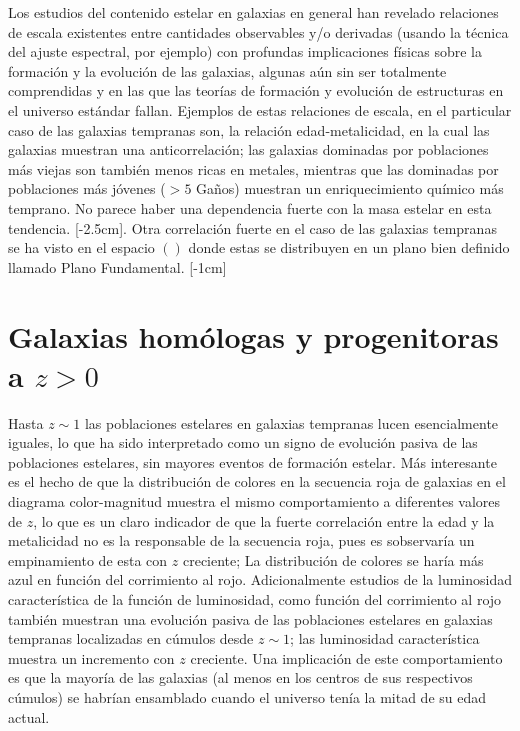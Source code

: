 \documentclass[a4paper,twoside]{article}
\begin{document}
Los estudios del contenido estelar en galaxias en general han revelado relaciones de escala existentes entre cantidades observables y/o derivadas (usando la técnica del ajuste espectral, por ejemplo) con profundas implicaciones físicas sobre la formación y la evolución de las galaxias, algunas aún sin ser totalmente comprendidas y en las que las teorías de formación y evolución de estructuras en el universo estándar fallan. Ejemplos de estas relaciones de escala, en el particular caso de las galaxias tempranas son, la relación edad-metalicidad, en la cual las galaxias muestran una anticorrelación; las galaxias dominadas por poblaciones más viejas son también menos ricas en metales, mientras que las dominadas por poblaciones más jóvenes ($>5$ Gaños) muestran un enriquecimiento químico más temprano. No parece haber una dependencia fuerte con la masa estelar en esta tendencia. [-2.5cm]. Otra correlación fuerte en el caso de las galaxias tempranas se ha visto en el espacio $()$ donde estas se distribuyen en un plano bien definido llamado Plano Fundamental. [-1cm]

\section{Galaxias homólogas y progenitoras a $z>0$}

Hasta $z\sim1$ las poblaciones estelares en galaxias tempranas lucen esencialmente iguales, lo que ha sido interpretado como un signo de evolución pasiva de las poblaciones estelares, sin mayores eventos de formación estelar. Más interesante es el hecho de que la distribución de colores en la secuencia roja de galaxias en el diagrama color-magnitud muestra el mismo comportamiento a diferentes valores de $z$, lo que es un claro indicador de que la fuerte correlación entre la edad y la metalicidad no es la responsable de la secuencia roja, pues es sobservaría un empinamiento de esta con $z$ creciente; La distribución de colores se haría más azul en función del corrimiento al rojo. Adicionalmente estudios de la luminosidad característica de la función de luminosidad, como función del corrimiento al rojo también muestran una evolución pasiva de las poblaciones estelares en galaxias tempranas localizadas en cúmulos desde $z\sim1$; las luminosidad característica muestra un incremento con $z$ creciente. Una implicación de este comportamiento es que la mayoría de las galaxias (al menos en los centros de sus respectivos cúmulos) se habrían ensamblado cuando el universo tenía la mitad de su edad actual.
\end{document}
